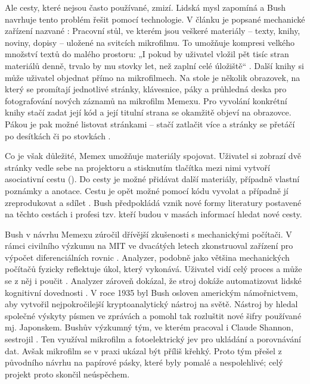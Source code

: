 Ale cesty, které nejsou často používané, zmizí. Lidská mysl zapomíná a Bush navrhuje tento problém řešit pomocí technologie. V článku je popsané mechanické zařízení nazvané : Pracovní stůl, ve kterém jsou veškeré materiály -- texty, knihy, noviny, dopisy -- uložené na svitcích mikrofilmu. To umožňuje kompresi velkého množství textů do malého prostoru: „I pokud by uživatel vložil pět tisíc stran materiálů denně, trvalo by mu stovky let, než zaplní celé úložiště“ \autocite[6]{Bush1945}. Další knihy si může uživatel objednat přímo na mikrofilmech. Na stole je několik obrazovek, na který se promítají jednotlivé stránky, klávesnice, páky a průhledná deska pro fotografování nových záznamů na mikrofilm Memexu. Pro vyvolání konkrétní knihy stačí zadat její kód a její titulní strana se okamžitě objeví na obrazovce. Pákou je pak možné listovat stránkami­ -- stačí zatlačit více a stránky se přetáčí po desítkách či po stovkách \autocite[6]{Bush1945}.

Co je však důležité, Memex umožňuje materiály spojovat. Uživatel si zobrazí dvě stránky vedle sebe na projektoru a stisknutím tlačítka mezi nimi vytvoří asociativní cestu (). Do cesty je možné přidávat další materiály, případně vlastní poznámky a anotace. Cestu je opět možné pomocí kódu vyvolat a případně jí zreprodukovat a sdílet \autocite[7]{Bush1945}. Bush předpokládá vznik nové formy literatury postavené na těchto cestách i profesi tzv.  kteří budou v masách informací hledat nové cesty.

Bush v návrhu Memexu zúročil dřívější zkušenosti s mechanickými počítači. V rámci civilního výzkumu na MIT ve dvacátých letech zkonstruoval zařízení pro výpočet diferenciálních rovnic . Analyzer, podobně jako většina mechanických počítačů fyzicky reflektuje úkol, který vykonává. Uživatel vidí celý proces a může se z něj i poučit \autocite[16--17]{Barnet2014}. Analyzer zároveň dokázal, že stroj dokáže automatizovat lidské kognitivní dovednosti \autocite[18]{Barnet2014}.  V roce 1935 byl Bush osloven americkým námořnictvem, aby vytvořil nejpokročilejší kryptoanalytický nástroj na světě. Nástroj by hledal společné výskyty písmen ve zprávách a pomohl tak rozluštit nové šifry používané mj. Japonskem. Bushův výzkumný tým, ve kterém pracoval i Claude Shannon, sestrojil . Ten využíval mikrofilm a fotoelektrický jev pro ukládání a porovnávání dat. Avšak mikrofilm se v praxi ukázal být příliš křehký. Proto tým přešel z původního návrhu na papírové pásky, které byly pomalé a nespolehlivé; celý projekt proto skončil neúspěchem. \autocite[18--19]{Barnet2014}

